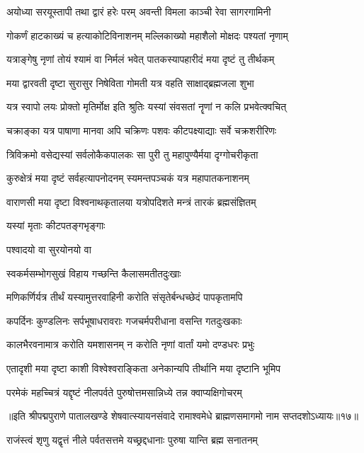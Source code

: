 \twolineshloka
{अयोध्या सरयूस्तापी तथा द्वारं हरेः परम्}
{अवन्ती विमला काञ्ची रेवा सागरगामिनी}%

\twolineshloka
{गोकर्णं हाटकाख्यं च हत्याकोटिविनाशनम्}
{मल्लिकाख्यो महाशैलो मोक्षदः पश्यतां नृणाम्}%

\twolineshloka
{यत्राङ्गेषु नृणां तोयं श्यामं वा निर्मलं भवेत्}
{पातकस्यापहारीदं मया दृष्टं तु तीर्थकम्}%

\twolineshloka
{मया द्वारवती दृष्टा सुरासुर निषेविता}
{गोमती यत्र वहति साक्षाद्ब्रह्मजला शुभा}%

\twolineshloka
{यत्र स्वापो लयः प्रोक्तो मृतिर्मोक्ष इति श्रुतिः}
{यस्यां संवसतां नॄणां न कलि प्रभवेत्क्वचित्}%

\twolineshloka
{चक्राङ्का यत्र पाषाणा मानवा अपि चक्रिणः}
{पशवः कीटपक्ष्याद्याः सर्वे चक्रशरीरिणः}%

\twolineshloka
{त्रिविक्रमो वसेद्यस्यां सर्वलोकैकपालकः}
{सा पुरी तु महापुण्यैर्मया दृग्गोचरीकृता}%

\twolineshloka
{कुरुक्षेत्रं मया दृष्टं सर्वहत्यापनोदनम्}
{स्यमन्तपञ्चकं यत्र महापातकनाशनम्}%

\twolineshloka
{वाराणसी मया दृष्टा विश्वनाथकृतालया}
{यत्रोपदिशते मन्त्रं तारकं ब्रह्मसंज्ञितम्}%

यस्यां मृताः कीटपतङ्गभृङ्गाः

पश्वादयो वा सुरयोनयो वा

\twolineshloka
{स्वकर्मसम्भोगसुखं विहाय}
{गच्छन्ति कैलासमतीतदुःखाः}%

\twolineshloka
{मणिकर्णिर्यत्र तीर्थं यस्यामुत्तरवाहिनी}
{करोति संसृतेर्बन्धच्छेदं पापकृतामपि}%

\twolineshloka
{कपर्दिनः कुण्डलिनः सर्पभूषाधरावराः}
{गजचर्मपरीधाना वसन्ति गतदुःखकाः}%

\twolineshloka
{कालभैरवनामात्र करोति यमशासनम्}
{न करोति नृणां वार्तां यमो दण्डधरः प्रभुः}%

\twolineshloka
{एतादृशी मया दृष्टा काशी विश्वेश्वराङ्किता}
{अनेकान्यपि तीर्थानि मया दृष्टानि भूमिप}%

\twolineshloka
{परमेकं महच्चित्रं यद्दृष्टं नीलपर्वते}
{पुरुषोत्तमसान्निध्ये तन्न क्वाप्यक्षिगोचरम्}%

॥इति श्रीपद्मपुराणे पातालखण्डे शेषवात्स्यायनसंवादे रामाश्वमेधे ब्राह्मणसमागमो नाम सप्तदशोऽध्यायः॥१७॥



\twolineshloka
{राजंस्त्वं शृणु यद्वृत्तं नीले पर्वतसत्तमे}
{यच्छ्रद्दधानाः पुरुषा यान्ति ब्रह्म सनातनम्}%

